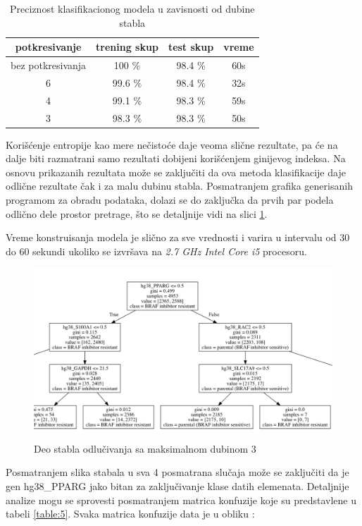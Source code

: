 \documentclass[a4paper]{article}
\begin{document}
\begin{table}[h!]
\centering
\begin{tabular}{|c c c c|} 
 \hline
  potkresivanje & trening skup & test skup & vreme 
  \\ [0.5ex] 
 \hline
 bez potkresivanja & 100 \% & 98.4 \% & 60s \\
 6 & 99.6 \% & 98.4 \% & 32s \\
 4 & 99.1 \% & 98.3 \% & 59s \\
 3 & 98.3 \% & 98.3 \% & 50s \\ [1ex] 
 \hline
\end{tabular}
\caption{Preciznost klasifikacionog modela u zavisnosti od dubine stabla}
\label{table:4}
\end{table}

Korišćenje entropije kao mere nečistoće daje veoma slične rezultate, pa će na dalje biti razmatrani 
samo rezultati dobijeni korišćenjem ginijevog indeksa. 
Na osnovu prikazanih rezultata može se zaključiti da ova metoda klasifikacije daje odlične rezultate čak i za malu dubinu stabla. Posmatranjem grafika generisanih programom za obradu podataka, dolazi se do zaključka da prvih par podela odlično dele prostor pretrage, što se detaljnije vidi na slici \ref{fig:slikastablo}. 

Vreme konstruisanja modela je slično za sve vrednosti i varira u intervalu od 30 do 60 sekundi ukoliko se izvršava na \textit{2.7 GHz Intel Core i5} procesoru.

\begin{figure}[h!]
\centering
 \includegraphics[width=1\textwidth]{slikastablo.png}
 \caption{Deo stabla odlučivanja sa maksimalnom dubinom 3}
 \label{fig:slikastablo}
\end{figure}

Posmatranjem slika stabala u sva 4 posmatrana slučaja može se zaključiti da je gen hg38\_PPARG jako bitan za zaključivanje klase datih elemenata.
Detaljnije analize mogu se sprovesti posmatranjem matrica konfuzije koje su predstavlene u tabeli \ref{table:5}. Svaka matrica konfuzije data je u obliku :
\end{document}
